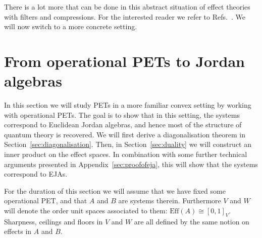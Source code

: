 \documentclass[a4paper,onecolumn,10pt,accepted=2019-05-03, issue=1, volume=1, shorttitle=papers/compositionality-1-1]{compositionalityarticle}
\DeclarePairedDelimiter{\ceil}{\lceil}{\rceil}
\numberwithin{counter}{section}
\newcommand{\pred}{\text{Eff}}
\begin{document}

\noindent There is a lot more that can be done in this abstract situation of effect theories with filters and compressions. For the interested reader we refer to Refs.~\cite{cho2015introduction,basthesis}. We will now switch to a more concrete setting.

\section{From operational PETs to Jordan algebras}\label{sec:opeffect}

In this section we will study PETs in a more familiar convex setting by working with operational PETs. The goal is to show that in this setting, the systems correspond to Euclidean Jordan algebras, and hence most of the structure of quantum theory is recovered. 
We will first derive a diagonalisation theorem in Section~\ref{sec:diagonalisation}. Then, in Section~\ref{sec:duality} we will construct an inner product on the effect spaces. In combination with some further technical arguments presented in Appendix~\ref{sec:proofofeja}, this will show that the systems correspond to EJAs.

For the duration of this section we will assume that we have fixed some operational PET, and that $A$ and $B$ are systems therein. Furthermore $V$ and $W$ will denote the order unit spaces associated to them: $\pred(A) \cong [0,1]_V$. Sharpness, ceilings and floors in $V$ and $W$ are all defined by the same notion on effects in $A$ and $B$.
\end{document}
